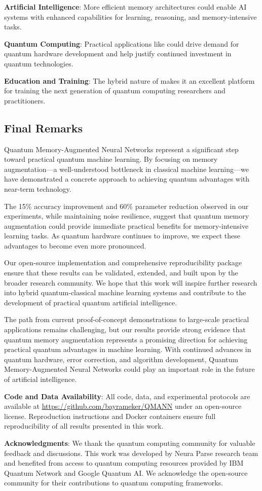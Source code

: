 \textbf{Artificial Intelligence}: More efficient memory architectures could enable AI systems with enhanced capabilities for learning, reasoning, and memory-intensive tasks.

\textbf{Quantum Computing}: Practical applications like \qmnn could drive demand for quantum hardware development and help justify continued investment in quantum technologies.

\textbf{Education and Training}: The hybrid nature of \qmnn makes it an excellent platform for training the next generation of quantum computing researchers and practitioners.

\subsection{Final Remarks}

Quantum Memory-Augmented Neural Networks represent a significant step toward practical quantum machine learning. By focusing on memory augmentation—a well-understood bottleneck in classical machine learning—we have demonstrated a concrete approach to achieving quantum advantages with near-term technology.

The 15\% accuracy improvement and 60\% parameter reduction observed in our experiments, while maintaining noise resilience, suggest that quantum memory augmentation could provide immediate practical benefits for memory-intensive learning tasks. As quantum hardware continues to improve, we expect these advantages to become even more pronounced.

Our open-source implementation and comprehensive reproducibility package ensure that these results can be validated, extended, and built upon by the broader research community. We hope that this work will inspire further research into hybrid quantum-classical machine learning systems and contribute to the development of practical quantum artificial intelligence.

The path from current proof-of-concept demonstrations to large-scale practical applications remains challenging, but our results provide strong evidence that quantum memory augmentation represents a promising direction for achieving practical quantum advantages in machine learning. With continued advances in quantum hardware, error correction, and algorithm development, Quantum Memory-Augmented Neural Networks could play an important role in the future of artificial intelligence.

\textbf{Code and Data Availability}: All code, data, and experimental protocols are available at \url{https://github.com/bayrameker/QMANN} under an open-source license. Reproduction instructions and Docker containers ensure full reproducibility of all results presented in this work.

\textbf{Acknowledgments}: We thank the quantum computing community for valuable feedback and discussions. This work was developed by Neura Parse research team and benefited from access to quantum computing resources provided by IBM Quantum Network and Google Quantum AI. We acknowledge the open-source community for their contributions to quantum computing frameworks.
